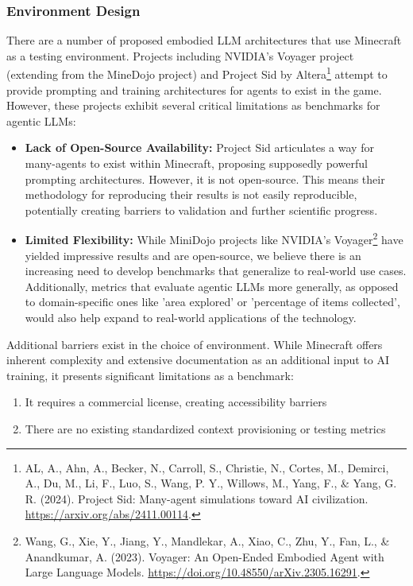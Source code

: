 \documentclass{article}
\begin{document}
\subsubsection{Environment Design}
There are a number of proposed embodied LLM architectures that use Minecraft as a testing environment.
Projects including NVIDIA's Voyager project (extending from the MineDojo project) and Project Sid by Altera\footnote{AL, A., Ahn, A., Becker, N., Carroll, S., Christie, N., Cortes, M., Demirci, A., Du, M., Li, F., Luo, S., Wang, P. Y., Willows, M., Yang, F., \& Yang, G. R. (2024). Project Sid: Many-agent simulations toward AI civilization. \url{https://arxiv.org/abs/2411.00114}.} attempt to provide prompting and training architectures for agents to exist in the game.
However, these projects exhibit several critical limitations as benchmarks for agentic LLMs:
\begin{itemize}[noitemsep,topsep=0pt]
    \item \textbf{Lack of Open-Source Availability:}
          Project Sid articulates a way for many-agents to exist within Minecraft, proposing supposedly powerful prompting architectures.
          However, it is not open-source.
          This means their methodology for reproducing their results is not easily reproducible, potentially creating barriers to validation and further scientific progress.
    \item \textbf{Limited Flexibility:}
          While MiniDojo projects like NVIDIA's Voyager\footnote{Wang, G., Xie, Y., Jiang, Y., Mandlekar, A., Xiao, C., Zhu, Y., Fan, L., \& Anandkumar, A. (2023). Voyager: An Open-Ended Embodied Agent with Large Language Models. \url{https://doi.org/10.48550/arXiv.2305.16291}.} have yielded impressive results and are open-source, we believe there is an increasing need to develop benchmarks that generalize to real-world use cases.
          Additionally, metrics that evaluate agentic LLMs more generally, as opposed to domain-specific ones like 'area explored' or 'percentage of items collected', would also help expand to real-world applications of the technology.
\end{itemize}

\vspace{-0.5em}
Additional barriers exist in the choice of environment.
While Minecraft offers inherent complexity and extensive documentation as an additional input to AI training, it presents significant limitations as a benchmark:
\begin{enumerate}[noitemsep]
    \item It requires a commercial license, creating accessibility barriers
    \item There are no existing standardized context provisioning or testing metrics
\end{enumerate}
\end{document}
